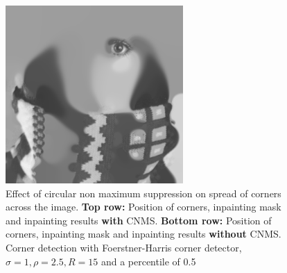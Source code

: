 \begin{figure}
    \includegraphics[width=0.31\linewidth]{../Images/trui-inpaint_non_cnms.png}
    \caption{Effect of circular non maximum suppression on spread of corners across the image.
        \textbf{Top row:} Position of corners, inpainting mask and inpainting results
        \textbf{with} CNMS.
\textbf{Bottom row:} Position of corners, inpainting mask and inpainting results \textbf{without} CNMS.
    Corner detection with Foerstner-Harris corner detector, $\sigma=1,\rho=2.5,R=15$ and a
percentile of 0.5}
\end{figure}
